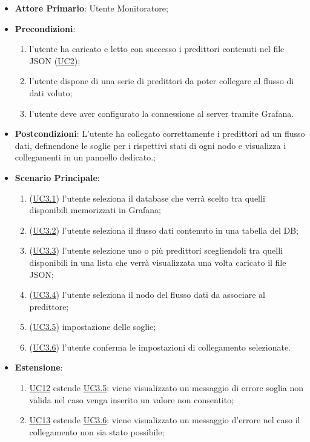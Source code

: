 		\begin{itemize}
			\item\textbf{Attore Primario}: Utente Monitoratore;
			\item\textbf{Precondizioni}: 
				\begin{enumerate}
					\item l’utente ha caricato e letto con successo i predittori contenuti nel file JSON (\hyperref[par:UC2]{UC2});
					\item l’utente dispone di una serie di predittori da poter collegare al flusso di dati voluto;
					\item l’utente deve aver configurato la connessione al server tramite Grafana.	
				\end{enumerate}
			\item\textbf{Postcondizioni}: L’utente ha collegato correttamente i predittori ad un flusso dati, definendone le soglie per i rispettivi stati di ogni nodo e visualizza i collegamenti in un pannello dedicato.;
			\item\textbf{Scenario Principale}:
				\begin{enumerate}
					\item (\hyperref[par:UC3.1]{UC3.1}) l’utente seleziona il database che verrà scelto tra quelli disponibili memorizzati in Grafana;
					\item (\hyperref[par:UC3.2]{UC3.2}) l’utente seleziona il flusso dati contenuto in una tabella del DB;
					\item (\hyperref[par:UC3.3]{UC3.3}) l'utente selezione uno o più predittori scegliendoli tra quelli disponibili in una lista che verrà visualizzata una volta caricato il file JSON; 
					\item (\hyperref[par:UC3.4]{UC3.4}) l'utente seleziona il nodo del flusso dati da associare al predittore;
					\item (\hyperref[par:UC3.5]{UC3.5}) impostazione delle soglie;
					\item (\hyperref[par:UC3.6]{UC3.6}) l'utente conferma le impostazioni di collegamento selezionate.	
				\end{enumerate}
			\item\textbf{Estensione}: 
				\begin{enumerate}
					\item\hyperref[par:UC12]{UC12} estende \hyperref[par:UC3.5]{UC3.5}: viene visualizzato un messaggio di errore soglia non valida nel caso venga inserito un valore non consentito;
					\item\hyperref[par:UC13]{UC13} estende \hyperref[par:UC3.6]{UC3.6}: viene visualizzato un messaggio d’errore nel caso il collegamento non sia stato possibile;

\end{enumerate}
\end{itemize}
